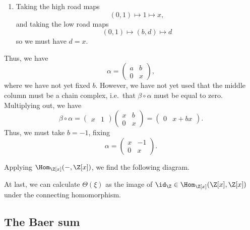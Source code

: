 \documentclass[main.tex]{subfiles}
\begin{document}
\begin{example}
\begin{enumerate}[label=(\arabic*)]
    \item Taking the high road maps
      \begin{equation*}
        (0, 1) \mapsto 1 \mapsto x,
      \end{equation*}
      and taking the low road maps
      \begin{equation*}
        (0, 1) \mapsto (b, d) \mapsto d
      \end{equation*}
      so we must have $d = x$.
  \end{enumerate}
  Thus, we have
  \begin{equation*}
    \alpha =
    \begin{pmatrix}
      a & b
      \\
      0 & x
    \end{pmatrix},
  \end{equation*}
  where we have not yet fixed $b$. However, we have not yet used that the middle column must be a chain complex, i.e.\ that $\beta \circ \alpha$ must be equal to zero. Multiplying out, we have
  \begin{equation*}
    \beta \circ \alpha =
    \begin{pmatrix}
      x & 1
    \end{pmatrix}
    \begin{pmatrix}
      x & b
      \\
      0 & x
    \end{pmatrix}
    =
    \begin{pmatrix}
      0 & x + bx
    \end{pmatrix}.
  \end{equation*}
  Thus, we must take $b = -1$, fixing
  \begin{equation*}
    \alpha =
    \begin{pmatrix}
      x & -1 \\
      0 & x
    \end{pmatrix}.
  \end{equation*}

  Applying $\Hom_{\Z[x]}(-, \Z[x])$, we find the following diagram.

  At last, we can calculate $\Theta(\xi)$ as the image of $\id_{\Z} \in \Hom_{\Z[x]}(\Z[x], \Z[x])$ under the connecting homomorphism.
\end{example}

\subsection{The Baer sum}
\label{ssc:baer_sum}
\end{document}
